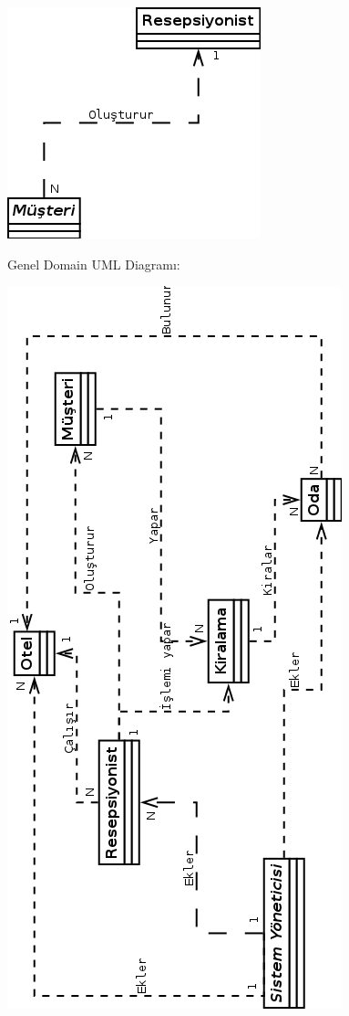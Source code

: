 \documentclass[12pt,a4paper]{report}
\begin{document}
\begin{center}
\includegraphics{dia/usecase1.png}
\end{center}

\newpage

\begin{description}
\item[Genel Domain UML Diagramı: ] \hfill

\end{description}

\includegraphics{dia/allusecasessmall.png}
\end{document}
